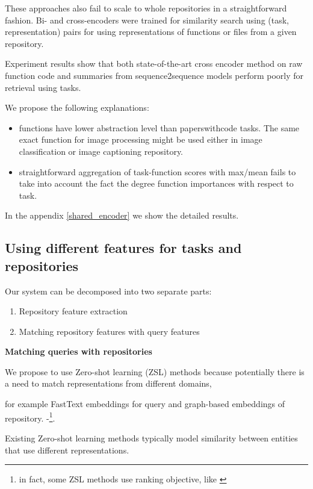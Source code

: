 \documentclass[11pt]{report}
\begin{document}
These approaches also fail to scale to whole repositories in a straightforward
fashion. Bi- and cross-encoders  were trained for similarity search using (task, representation) pairs for
using representations of functions or files from a given repository. 

Experiment results show that both state-of-the-art cross encoder method on raw function
code and summaries from sequence2sequence models perform poorly for retrieval
using tasks.

We propose the following explanations:

\begin{itemize}
\item functions have lower abstraction level than paperswithcode tasks. The same
  exact function for image processing might be used either in image
  classification or image captioning repository.
\item straightforward aggregation of task-function scores with max/mean fails to
  take into account the fact the degree function importances with respect to task. 
\end{itemize}

In the appendix \ref{shared_encoder} we show the detailed results.

\subsection{Using different features for tasks and repositories}

Our system can be decomposed into two separate parts:

\begin{enumerate}

\item Repository feature extraction

\item Matching repository features with query features

\end{enumerate}

\textbf{Matching queries with repositories}

We propose to use Zero-shot learning (ZSL) methods because potentially there is a need to match representations from different domains,

for example FastText embeddings for query and graph-based embeddings of repository.
-\footnote{in fact, some ZSL methods use ranking objective, like \cite{label_embedding}}. 

Existing Zero-shot learning methods typically model similarity between entities that use different representations.
\end{document}
